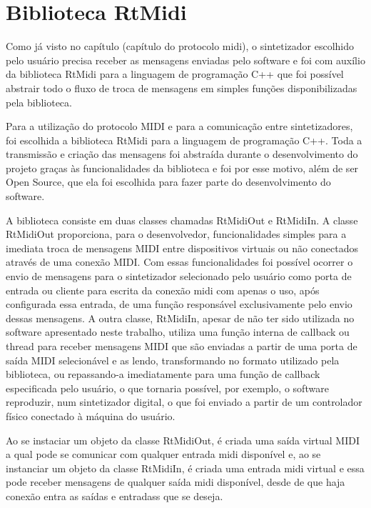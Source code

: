 \documentclass[12pt]{report}
\begin{document}
{\appendix
\chapter{Biblioteca RtMidi}

Como já visto no capítulo (capítulo do protocolo midi), o sintetizador escolhido pelo usuário precisa receber as mensagens enviadas pelo software e foi com auxílio da biblioteca RtMidi para a linguagem de programação C++ que foi possível abstrair todo o fluxo de troca de mensagens em simples funções disponibilizadas pela biblioteca.

Para a utilização do protocolo MIDI e para a comunicação entre sintetizadores, foi escolhida a biblioteca RtMidi para a linguagem de programação C++. Toda a transmissão e criação das mensagens foi abstraída durante o desenvolvimento do projeto graças às funcionalidades da biblioteca e foi por esse motivo, além de ser Open Source, que ela foi escolhida para fazer parte do desenvolvimento do software.

A biblioteca consiste em duas classes chamadas RtMidiOut e RtMidiIn. A classe RtMidiOut proporciona, para o desenvolvedor, funcionalidades simples para a imediata troca de mensagens MIDI entre dispositivos virtuais ou não conectados através de uma conexão MIDI. Com essas funcionalidades foi possível ocorrer o envio de mensagens para o sintetizador selecionado pelo usuário como porta de entrada ou cliente para escrita da conexão midi com apenas o uso, após configurada essa entrada, de uma função responsável exclusivamente pelo envio dessas mensagens. A outra classe, RtMidiIn, apesar de não ter sido utilizada no software apresentado neste trabalho, utiliza uma função interna de callback ou thread para receber mensagens MIDI que são enviadas a partir de uma porta de saída MIDI selecionável e as lendo, transformando no formato utilizado pela biblioteca, ou repassando-a imediatamente para uma função de callback especificada pelo usuário, o que tornaria possível, por exemplo, o software reproduzir, num sintetizador digital, o que foi enviado a partir de um controlador físico conectado à máquina do usuário.

Ao se instaciar um objeto da classe RtMidiOut, é criada uma saída virtual MIDI a qual pode se comunicar com qualquer entrada midi disponível e, ao se instanciar um objeto da classe RtMidiIn, é criada uma entrada midi virtual e essa pode receber mensagens de qualquer saída midi disponível, desde de que haja conexão entra as saídas e entradass que se deseja.

}
\end{document}
